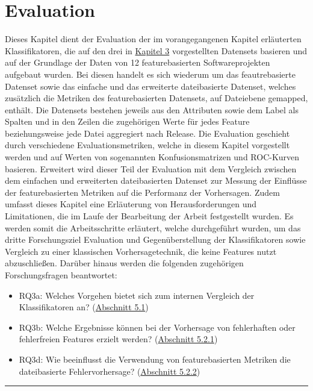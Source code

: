 
\chapter{Evaluation}
\label{evaluation}

Dieses Kapitel dient der Evaluation der im vorangegangenen Kapitel erläuterten Klassifikatoren, die auf den drei in \hyperref[dataset-creation]{Kapitel 3} vorgestellten Datensets basieren und auf der Grundlage der Daten von 12 featurebasierten Softwareprojekten aufgebaut wurden. Bei diesen handelt es sich wiederum um das feautrebasierte Datenset sowie das \glqq einfache\grqq{} und das erweiterte dateibasierte Datenset, welches zusätzlich die Metriken des featurebasierten Datensets, auf Dateiebene gemapped, enthält. Die Datensets bestehen jeweils aus den Attributen sowie dem Label als Spalten und in den Zeilen die zugehörigen Werte für jedes Feature beziehungsweise jede Datei aggregiert nach Release. Die Evaluation geschieht durch verschiedene Evaluationsmetriken, welche in diesem Kapitel vorgestellt werden und auf Werten von sogenannten Konfusionsmatrizen und ROC-Kurven basieren. Erweitert wird dieser Teil der Evaluation mit dem Vergleich zwischen dem \glqq einfachen\grqq{} und erweiterten dateibasierten Datenset zur Messung der Einflüsse der featurebasierten Metriken auf die Performanz der Vorhersagen. Zudem umfasst dieses Kapitel eine Erläuterung von Herausforderungen und Limitationen, die im Laufe der Bearbeitung der Arbeit festgestellt wurden. Es werden somit die Arbeitsschritte erläutert, welche durchgeführt wurden, um das dritte Forschungsziel \glqq Evaluation und Gegenüberstellung der Klassifikatoren sowie Vergleich zu einer klassischen Vorhersagetechnik, die keine Features nutzt\grqq{} abzuschließen. Darüber hinaus werden die folgenden zugehörigen Forschungsfragen beantwortet:
\vspace{-\topsep}
\begin{itemize}
\setlength{\itemsep}{-2pt}
 \item RQ3a: Welches Vorgehen bietet sich zum internen Vergleich der Klassifikatoren an? (\hyperref[eval-metrics]{Abschnitt 5.1})
 \item RQ3b: Welche Ergebnisse können bei der Vorhersage von fehlerhaften oder fehlerfreien Features erzielt werden? (\hyperref[feat-results]{Abschnitt 5.2.1})
 \item RQ3d: Wie beeinflusst die Verwendung von featurebasierten Metriken die dateibasierte Fehlervorhersage? (\hyperref[classic-eval]{Abschnitt 5.2.2})
\end{itemize} 
\smallskip
\hrule

